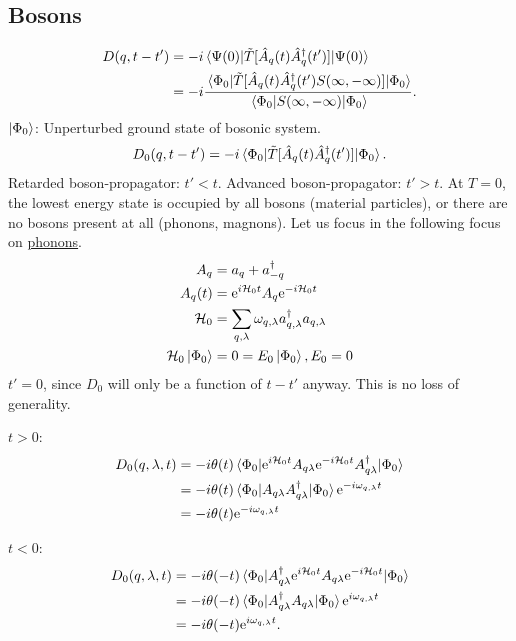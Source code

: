 \subsection{Bosons} %

\begin{align*} 
D(q, t-t') &= -i\ev{\tilde{T}[\hat{A}_q(t)\hat{A}_q^\dagger(t')]}{\Psi(0)} \\
&= -i\frac{\ev{\tilde{T}[\hat{A}_q(t)\hat{A}_q^\dagger(t')S(\infty, -\infty)]}{\Phi_0}}{\ev{S(\infty, -\infty)}{\Phi_0}}.
\end{align*}
$\ket{\Phi_0}$: Unperturbed ground state of bosonic system. 
\begin{equation} 
\label{eq:non_int_greens_boson}
D_0(q, t-t') = -i\ev{\tilde{T}[\hat{A}_q(t)\hat{A}_q^\dagger(t')]}{\Phi_0}.
\end{equation}
Retarded boson-propagator: $t'<t$. Advanced boson-propagator: $t'>t$. At $T = 0$, the lowest energy state is occupied by all bosons (material particles), or there are no bosons present at all (phonons, magnons).
Let us focus in the following focus on \underline{phonons}.
\begin{align*} 
A_q &= a_q + a_{-q}^\dagger \\
A_q(t) &= \mathrm{e}^{i\mathcal{H}_0 t}A_q\mathrm{e}^{-i\mathcal{H}_0t} \\
\mathcal{H}_0 &= \sum_{q, \lambda }\omega_{q, \lambda}a_{q,\lambda}^\dagger a_{q,\lambda} \\
\mathcal{H}_0\ket{\Phi_0} &= 0 = E_0\ket{\Phi_0}, E_0 = 0
\end{align*}
$t'=0$, since $D_0$ will only be a function of $t-t'$ anyway. This is no loss of generality.

\textbf{$t>0$}:
\begin{align} 
\begin{split} 
D_0(q, \lambda, t) &= -i\theta(t)\ev{\e^{i\Ha_0 t}A_{q\lambda}\e^{-i\Ha_0t}A_{q\lambda}^\dagger}{\Phi_0} \\
&= -i\theta(t)\ev{A_{q\lambda}A_{q\lambda}^\dagger}{\Phi_0}\e^{-i\omega_{q,\lambda}t}\\
&= -i\theta(t)\e^{-i\omega_{q, \lambda}t}
\end{split}
\end{align}

\textbf{$t<0$}:
\begin{align} 
\begin{split} 
D_0(q, \lambda, t) &= -i\theta(-t)\ev{A_{q\lambda}^\dagger\e^{i\Ha_0 t}A_{q\lambda}\e^{-i\Ha_0t}}{\Phi_0} \\
&= -i\theta(-t)\ev{A_{q\lambda}^\dagger A_{q\lambda}}{\Phi_0}\e^{i\omega_{q,\lambda}t}\\
&= -i\theta(-t)\e^{i\omega_{q, \lambda}t}.
\end{split}
\end{align}

